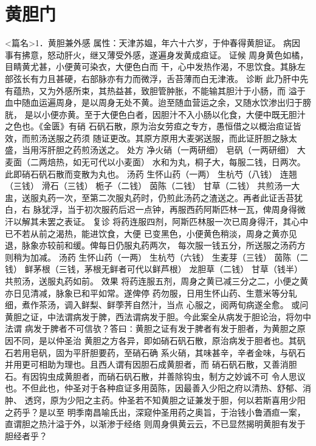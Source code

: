 \documentclass[a4paper,12pt,UTF8,twoside]{ctexbook}
\begin{document}
\chapter{黄胆门}
<篇名>1．黄胆兼外感
属性：天津苏媪，年六十六岁，于仲春得黄胆证。 
病因 事有拂意，怒动肝火，继又薄受外感，遂遍身发黄成疸证。 
证候 周身黄色如橘，目睛黄尤甚，小便黄可染衣，大便色白而 
干，心中发热作渴，不思饮食。其脉左部弦长有力且甚硬，右部脉亦有力而微浮，舌苔薄而白无津液。 
诊断 此乃肝中先有蕴热，又为外感所束，其热益甚，致胆管肿胀，不能输其胆汁于小肠，而 
溢于血中随血运遍周身，是以周身无处不黄。迨至随血营运之余，又随水饮渗出归于膀胱， 
是以小便亦黄。至于大便色白者，因胆汁不入小肠以化食，大便中既无胆汁之色也。《金匮》有硝 
石矾石散，原为治女劳疸之专方，愚恒借之以概治疸证皆效，而煎汤送服之药须 
随证更改。其原方原用大麦粥送服，而此证肝胆之脉太盛，当用泻肝胆之药煎汤送之。 
处方 净火硝（一两研细） 皂矾（一两研细） 大麦面（二两焙热，如无可代以小麦面） 
水和为丸，桐子大，每服二钱，日两次。此即硝石矾石散而变散为丸也。 
汤药 生怀山药（一两） 生杭芍（八钱） 连翘（三钱） 滑石（三钱） 
栀子（二钱） 茵陈（二钱） 甘草（二钱） 
共煎汤一大盅，送服丸药一次，至第二次服丸药时，仍煎此汤药之渣送之。再者此证舌苔犹白，右 
脉犹浮，当于初次服药后迟一点钟，再服西药阿斯匹林一瓦，俾周身得微汗以解其未罢之表证。 
复诊 将药连服四剂，阿斯匹林服一次已周身得汗，其心中已不若从前之渴热，能进饮食，大便 
已变黑色，小便黄色稍淡，周身之黄亦见退，脉象亦较前和缓。俾每日仍服丸药两次， 
每次服一钱五分，所送服之汤药方则稍为加减。 
汤药 生怀山药（一两） 生杭芍（六钱） 生麦芽（三钱） 
茵陈（二钱） 鲜茅根（三钱，茅根无鲜者可代以鲜芦根） 龙胆草（二钱） 甘草（钱半） 
共煎汤，送服丸药如前。 
效果 将药连服五剂，周身之黄已减三分之二，小便之黄亦日见清减，脉象已和平如常。遂俾停 
药勿服，日用生怀山药、生薏米等分轧细，煮作茶汤，调入鲜梨、鲜荸荠自然汁，当点 
心服之，阅两旬病遂全愈。 
或问 黄胆之证，中法谓病发于脾，西法谓病发于胆。今此案全从病发于胆论治，将勿中法谓 
病发于脾者不可信欤？答曰∶黄胆之证有发于脾者有发于胆者，为黄胆之原因不同，是以仲圣治 
黄胆之方各异，即如硝石矾石散，原治病发于胆者也。其矾石若用皂矾，固为平肝胆要药，至硝石确 
系火硝，其味甚辛，辛者金味，与矾石并用更可相助为理也。且西人谓有因胆石成黄胆者，而 
硝石矾石散，又善消胆石。有因钩虫成黄胆者，而硝石矾石散，并善除钩虫，制方之妙诚不可 
令人思议也。不但此也，仲圣对于各种疸证多用茵陈，因最善入少阳之府以清热、舒郁、消肿、 
透窍，原为少阳之主药。仲圣若不知黄胆之证兼发于胆，何以若斯喜用少阳之药乎？是以至 
明季南昌喻氏出，深窥仲圣用药之奥旨，于治钱小鲁酒疸一案，直谓胆之热汁溢于外，以渐渗于经络 
则周身俱黄云云，不已显然揭明黄胆有发于胆经者乎？ 
\end{document}
